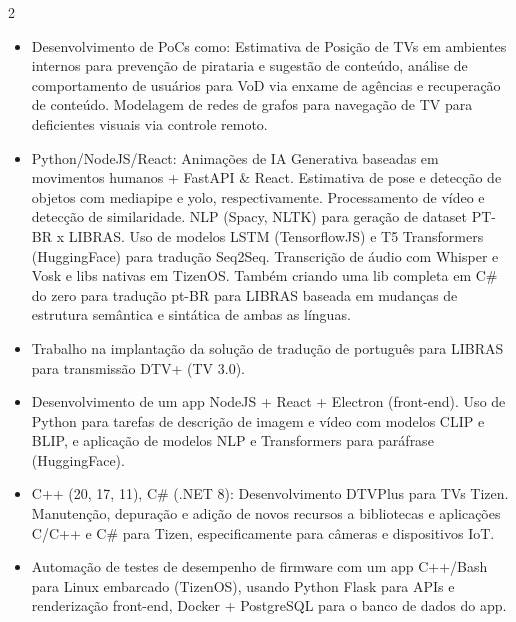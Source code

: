 \documentclass[10pt,a4paper,ragged2e,withhyper]{altacv}
\begin{document}
\begin{paracol}{2}


\begin{itemize}

    \item Desenvolvimento de PoCs como: Estimativa de Posição de TVs em ambientes internos para prevenção de pirataria e sugestão de conteúdo, análise de comportamento de usuários para VoD via enxame de agências e recuperação de conteúdo. Modelagem de redes de grafos para navegação de TV para deficientes visuais via controle remoto.

    \item Python/NodeJS/React: Animações de IA Generativa baseadas em movimentos humanos + FastAPI \& React. Estimativa de pose e detecção de objetos com mediapipe e yolo, respectivamente. Processamento de vídeo e detecção de similaridade. NLP (Spacy, NLTK) para geração de dataset PT-BR x LIBRAS. Uso de modelos LSTM (TensorflowJS) e T5 Transformers (HuggingFace) para tradução Seq2Seq. Transcrição de áudio com Whisper e Vosk e libs nativas em TizenOS. Também criando uma lib completa em C\# do zero para tradução pt-BR para LIBRAS baseada em mudanças de estrutura semântica e sintática de ambas as línguas.

    \item Trabalho na implantação da solução de tradução de português para LIBRAS para transmissão DTV+ (TV 3.0).
    
    \item Desenvolvimento de um app NodeJS + React + Electron (front-end). Uso de Python para tarefas de descrição de imagem e vídeo com modelos CLIP e BLIP, e aplicação de modelos NLP e Transformers para paráfrase (HuggingFace).
    
    \item C++ (20, 17, 11), C\# (.NET 8): Desenvolvimento DTVPlus para TVs Tizen. Manutenção, depuração e adição de novos recursos a bibliotecas e aplicações C/C++ e C\# para Tizen, especificamente para câmeras e dispositivos IoT.
    
    \item Automação de testes de desempenho de firmware com um app C++/Bash para Linux embarcado (TizenOS), usando Python Flask para APIs e renderização front-end, Docker + PostgreSQL para o banco de dados do app.
    

\end{itemize}
\end{paracol}
\end{document}

